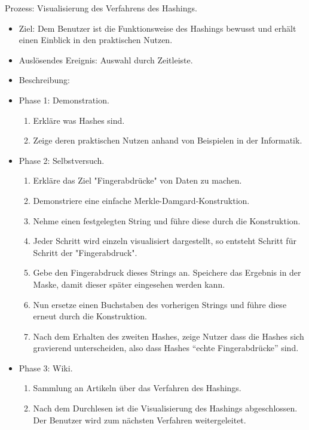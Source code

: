 \documentclass{article}
\begin{document}
\begin{FA}[start=600]
 \item Prozess: Visualisierung des Verfahrens des Hashings.
\end{FA}
\begin{itemize}[label={}]

 \item Ziel: Dem Benutzer ist die Funktionsweise des Hashings bewusst und erhält 
       einen Einblick in den praktischen Nutzen.

 \item Auslösendes Ereignis: Auswahl durch Zeitleiste.

 \item Beschreibung:

 \item Phase 1: Demonstration.

	\begin{enumerate}[]
	 \item Erkläre was Hashes sind.
	 \item Zeige deren praktischen Nutzen anhand von Beispielen in der Informatik.
	\end{enumerate}

 \item Phase 2: Selbstversuch.

	\begin{enumerate}
	 \item Erkläre das Ziel "Fingerabdrücke" von Daten zu machen.
	 \item Demonstriere eine einfache Merkle-Damgard-Konstruktion.
	 \item Nehme einen festgelegten String und führe diese durch die Konstruktion.
	 \item Jeder Schritt wird einzeln visualisiert dargestellt, so entsteht Schritt für Schritt der "Fingerabdruck".
	 \item Gebe den Fingerabdruck dieses Strings an. Speichere das Ergebnis in der Maske, damit dieser später eingesehen werden kann.
	 \item Nun ersetze einen Buchstaben des vorherigen Strings und führe diese erneut durch die Konstruktion.
	 \item Nach dem Erhalten des zweiten Hashes, zeige Nutzer dass die Hashes sich gravierend unterscheiden, also dass Hashes ``echte Fingerabdrücke'' sind.
	\end{enumerate}

 \item Phase 3: Wiki.

	\begin{enumerate}
	 \item Sammlung an Artikeln über das Verfahren des Hashings.
	 \item Nach dem Durchlesen ist die Visualisierung des Hashings abgeschlossen. Der Benutzer wird zum nächsten Verfahren weitergeleitet.
 	\end{enumerate}

\end{itemize}
\end{document}
